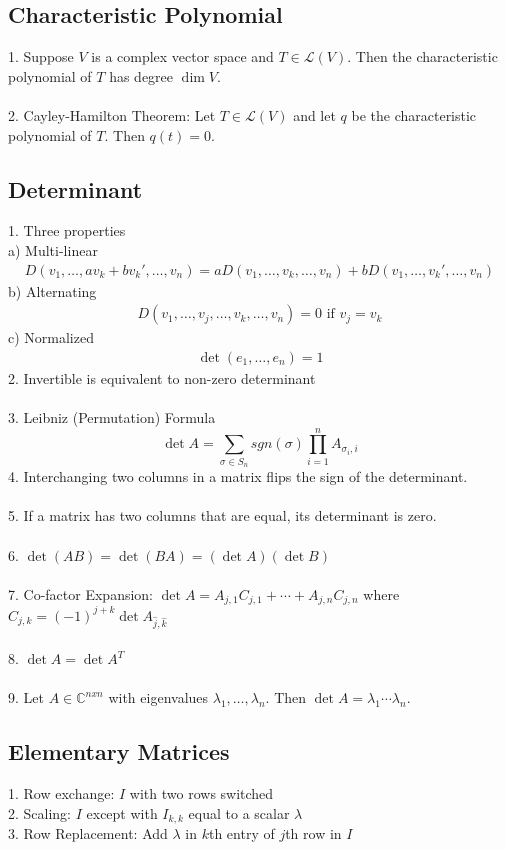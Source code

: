 \documentclass[11pt,reqno]{article}
\newcommand{\C}{\mathbb{C}}
\theoremstyle{definition}
\begin{document}
\subsection*{Characteristic Polynomial}
1. Suppose $V$ is a complex vector space and $T\in\mathcal{L}(V)$. Then the characteristic polynomial of $T$ has degree $\dim V$.\\\\
2. Cayley-Hamilton Theorem: Let $T\in\mathcal{L}(V)$ and let $q$ be the characteristic polynomial of $T$. Then $q(t) = 0$.

\subsection*{Determinant}
1. Three properties\\
\indent a) Multi-linear
\begin{align*}
    D(v_1,\ldots,av_k+bv_k',\ldots,v_n) = aD(v_1,\ldots,v_k,\ldots,v_n)+bD(v_1,\ldots,v_k',\ldots,v_n)
\end{align*}
\indent b) Alternating
\begin{align*}
    D(v_1,\ldots,v_j,\ldots,v_k,\ldots,v_n)=0 \text{ if } v_j=v_k
\end{align*}
\indent c) Normalized
\begin{align*}
    \det(e_1,\ldots,e_n)=1
\end{align*}
2. Invertible is equivalent to non-zero determinant\\\\
3. Leibniz (Permutation) Formula \[\det A = \sum_{\sigma\in S_n} sgn(\sigma)\prod_{i=1}^n A_{\sigma_i,i}\]
4. Interchanging two columns in a matrix flips the sign of the determinant.\\\\
5. If a matrix has two columns that are equal, its determinant is zero.\\\\
6. $\det (AB) = \det (BA) = (\det A) (\det B)$\\\\
7. Co-factor Expansion: $\det A = A_{j,1}C_{j,1}+\cdots+A_{j,n}C_{j,n}$ where $C_{j,k} = (-1)^{j+k}\det A_{\hat{j},\hat{k}}$\\\\
8. $\det A = \det A^T$\\\\
9. Let $A\in\C^{nxn}$ with eigenvalues $\lambda_1,\ldots,\lambda_n$. Then $\det A = \lambda_1\cdots\lambda_n$.

\subsection*{Elementary Matrices}
1. Row exchange: $I$ with two rows switched\\
2. Scaling: $I$ except with $I_{k,k}$ equal to a scalar $\lambda$\\
3. Row Replacement: Add $\lambda$ in $k$th entry of $j$th row in $I$
\end{document}
